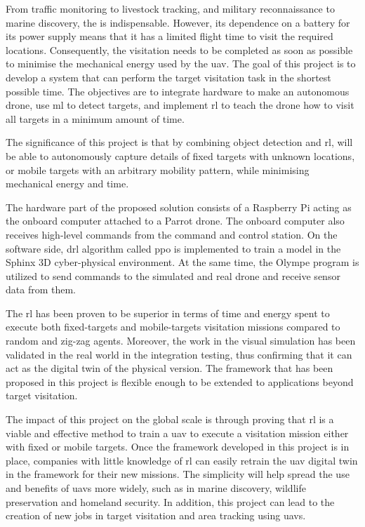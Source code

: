 \documentclass[../main.tex]{subfiles}
\begin{document}
From traffic monitoring to livestock tracking, and 
military reconnaissance to marine discovery, the \uav
is indispensable.
However, its dependence on a battery for its power supply means
that it has a limited flight time to visit the required
locations. 
Consequently, the visitation needs to be
completed as soon as possible to minimise 
the mechanical energy used by the \gls{uav}.
The goal of this project is to develop a system 
that can perform the target visitation task in the shortest
possible time. The objectives are to integrate hardware to make
an autonomous drone, use \gls{ml} 
to detect targets,
and implement \gls{rl} to 
teach the drone how to visit all targets in a minimum amount of time.

The significance of this project is that 
by combining object detection and \gls{rl}, \uavs will be
able to autonomously capture details of 
fixed targets with unknown locations, 
or mobile targets with an arbitrary mobility pattern,
while minimising mechanical energy and time.

The hardware part of the proposed solution 
consists of a Raspberry Pi acting as the onboard computer
attached to a Parrot \anafi drone. The onboard computer
also receives high-level commands from the command and control
station. On the software side, \gls{drl} algorithm called \gls{ppo} is 
implemented to train a model in the Sphinx 3D
cyber-physical environment. At the same time,
the Olympe program is utilized
to send commands to the simulated and real \anafi drone
and receive sensor data from them. 

The \gls{rl} has been proven to be superior in terms of time and
energy spent to execute both fixed-targets and mobile-targets
visitation missions compared to random and zig-zag agents.
Moreover, the work in the visual simulation has been validated in the
real world in the integration testing, thus confirming that it can act
as the digital twin of the physical version.
The framework that has been proposed in this project is flexible
enough to be extended to applications beyond target visitation.

The impact of this project on the global scale is through proving that
\gls{rl} is a viable and effective method to train a \gls{uav} to
execute a visitation mission either with fixed or mobile targets.
Once the framework developed in this project is in place, companies
with little knowledge of \gls{rl} can easily retrain the \gls{uav}
digital twin in the framework for their new missions. 
The simplicity will help spread the use and benefits of \glspl{uav}
more widely, such as in marine discovery, wildlife preservation and
homeland security. 
In addition, this project can lead to the creation of new jobs in
target visitation and area tracking using \glspl{uav}.
\end{document}

